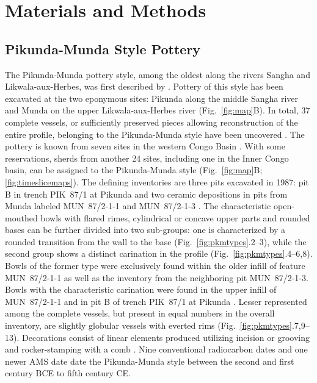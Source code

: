 \documentclass[smallextended,natbib]{svjour3}       %
\begin{document}
\section{Materials and Methods}\label{materials}

\subsection{Pikunda-Munda Style Pottery}

The Pikunda-Munda pottery style, among the oldest along the rivers Sangha and Likwala-aux-Herbes, was first described by \citet{Eggert.1992}. Pottery of this style has been excavated at the two eponymous sites: Pikunda along the middle Sangha river and Munda on the upper Likwala-aux-Herbes river (Fig.~\ref{fig:map}B). In total, 37 complete vessels, or sufficiently preserved pieces allowing reconstruction of the entire profile, belonging to the Pikunda-Munda style have been uncovered \citep[114--115]{Seidensticker.2021e}. The pottery is known from seven sites in the western Congo Basin \citep[119--120 Fig.~49]{Seidensticker.2021e}. With some reservations, sherds from another 24 sites, including one in the Inner Congo basin, can be assigned to the Pikunda-Munda style (Fig.~\ref{fig:map}B; \ref{fig:timeslicemaps}). The defining inventories are three pits excavated in 1987: pit B in trench PIK~87/1 at Pikunda \citep[288--300]{Seidensticker.2021e} and two ceramic depositions in pits from Munda labeled MUN~87/2-1-1 and MUN~87/2-1-3 \citep[321--335]{Seidensticker.2021e}. The characteristic open-mouthed bowls with flared rimes, cylindrical or concave upper parts and rounded bases \citep[311-314]{Eggert.1993} can be further divided into two sub-groups: one is characterized by a rounded transition from the wall to the base (Fig.~\ref{fig:pkmtypes}.2--3), while the second group shows a distinct carination in the profile (Fig.~\ref{fig:pkmtypes}.4--6,8). Bowls of the former type were exclusively found within the older infill of feature MUN~87/2-1-1 as well as the inventory from the neighboring pit MUN~87/2-1-3. Bowls with the characteristic carination were found in the upper infill of MUN~87/2-1-1 and in pit B of trench PIK~87/1 at Pikunda \citep[115--117]{Seidensticker.2021e}. Lesser represented among the complete vessels, but present in equal numbers in the overall inventory, are slightly globular vessels with everted rims (Fig.~\ref{fig:pkmtypes}.7,9--13). Decorations consist of linear elements produced utilizing incision or grooving and rocker-stamping with a comb \citep[362 App.~4.12]{Seidensticker.2021e}. Nine conventional radiocarbon dates \citep[117 Fig.~48, 355--356 App.~2]{Seidensticker.2021e} and one newer AMS date \citep[Tab.~2: RICH-30864]{Seidensticker.2024} date the Pikunda-Munda style between the second and first century BCE to fifth century CE.
\end{document}

